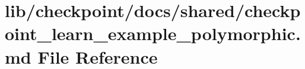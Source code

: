 \hypertarget{checkpoint__learn__example__polymorphic_8md}{}\section{lib/checkpoint/docs/shared/checkpoint\+\_\+learn\+\_\+example\+\_\+polymorphic.md File Reference}
\label{checkpoint__learn__example__polymorphic_8md}

